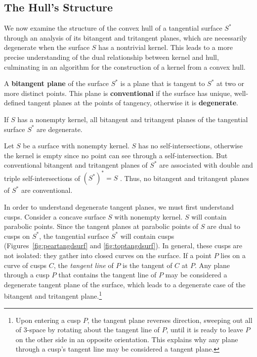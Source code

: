 \documentclass{acmsiggraph}
\begin{document}
\subsection{The Hull's Structure}
\label{sec:cusp}

We now examine the structure of the convex hull of a tangential
surface $S^*$ through an analysis of its bitangent and tritangent planes,
which are necessarily degenerate when the surface $S$ has a nontrivial kernel.
This leads to a more precise understanding of the 
dual relationship between kernel and hull, culminating in an
algorithm for the construction of a kernel from a convex hull.

\begin{defn2}
A {\bf bitangent plane} of the surface $S^*$ is a plane that
is tangent to $S^*$ at two or more distinct points.
This plane is {\bf conventional} if the surface has unique, well-defined 
tangent planes at the points of tangency,
otherwise it is {\bf degenerate}.
\end{defn2}

\begin{lemma}
If $S$ has a nonempty kernel, all bitangent and tritangent planes 
of the tangential surface $S^*$ are degenerate.
\end{lemma}
\prf
Let $S$ be a surface with nonempty kernel.
$S$ has no self-intersections, otherwise the kernel is empty
since no point can see through a self-intersection.
But conventional bitangent and tritangent planes of $S^*$ are associated
with double and triple self-intersections of $(S^*)^* = S$ \cite{jj04tangsurf}.
Thus, no bitangent and tritangent planes of $S^*$ are conventional.
\QED

In order to understand degenerate tangent planes, we must first understand cusps.
Consider a concave
surface $S$ with nonempty kernel.
$S$ will contain parabolic points.
Since the tangent planes at parabolic points of $S$ are dual to cusps on $S^*$,
the tangential surface $S^*$ will contain cusps 
(Figures~\ref{fig:peartangdsurf} and \ref{fig:toptangdsurf}).
In general, these cusps are not isolated: they gather into closed curves on the surface.
If a point $P$ lies on a curve of cusps $C$,
the {\em tangent line} of $P$ is the tangent of $C$ at $P$.
Any plane through a cusp $P$ that contains the tangent line of $P$ may be considered
a degenerate tangent plane of the surface,
which leads to a degenerate case of the bitangent and tritangent plane.\footnote{Upon entering a cusp $P$, 
	the tangent plane reverses direction, sweeping out all of 3-space 
	by rotating about the tangent line of $P$,
	until it is ready to leave $P$ on the other side in an opposite orientation.
        This explains why any plane through a cusp's tangent line may be considered a tangent plane.}
\end{document}
